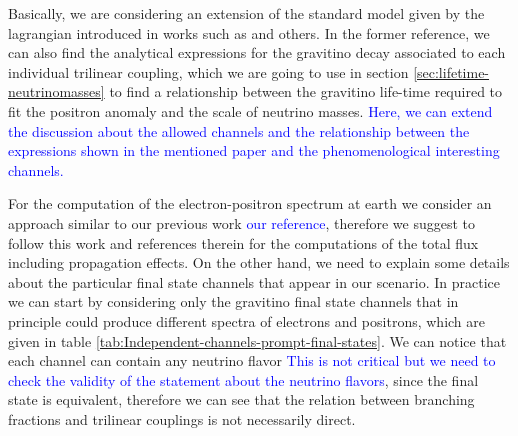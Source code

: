 \documentclass[a4paper,11pt]{article}
\newcommand*{\blue}{\textcolor{blue}}
\begin{document}
Basically, we are considering an extension of the standard model given by the lagrangian introduced in
works such as \cite{Moreau:2001sr} and others. In the former reference, we can also find the analytical expressions for the gravitino decay associated to each individual trilinear coupling, which we are going to use in section \ref{sec:lifetime-neutrinomasses} to find a relationship between the gravitino life-time required to fit the positron anomaly and the scale of neutrino masses. \blue{Here, we can extend the discussion about the allowed channels and the relationship between the expressions shown
in the mentioned paper and the phenomenological interesting channels.}

For the computation of the electron-positron spectrum at earth we consider an approach similar to our previous work \blue{our reference}, therefore we suggest to follow this work and references therein for the computations of the total flux including propagation effects. On the other hand, we need to explain some details about the particular final state channels that appear in our scenario. In practice we can start by considering only the gravitino final state channels that in principle could produce different spectra of electrons and positrons, which are given in table \ref{tab:Independent-channels-prompt-final-states}. We can notice that each channel can contain any neutrino flavor \blue{This is not critical but we need to check the validity of the statement about the neutrino flavors}, since the final state is equivalent, therefore we can see that the relation between branching fractions and trilinear couplings is not necessarily direct.
\end{document}
